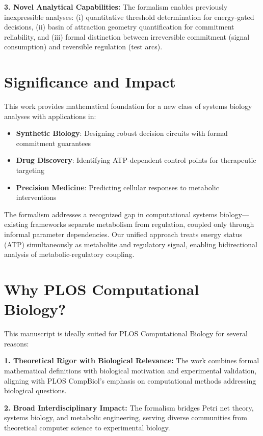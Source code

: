 \documentclass[11pt,letterpaper]{article}
\begin{document}
\textbf{3. Novel Analytical Capabilities:} The formalism enables previously inexpressible analyses: (i) quantitative threshold determination for energy-gated decisions, (ii) basin of attraction geometry quantification for commitment reliability, and (iii) formal distinction between irreversible commitment (signal consumption) and reversible regulation (test arcs).

\section*{Significance and Impact}

This work provides mathematical foundation for a new class of systems biology analyses with applications in:

\begin{itemize}
\item \textbf{Synthetic Biology}: Designing robust decision circuits with formal commitment guarantees
\item \textbf{Drug Discovery}: Identifying ATP-dependent control points for therapeutic targeting
\item \textbf{Precision Medicine}: Predicting cellular responses to metabolic interventions
\end{itemize}

The formalism addresses a recognized gap in computational systems biology---existing frameworks separate metabolism from regulation, coupled only through informal parameter dependencies. Our unified approach treats energy status (ATP) simultaneously as metabolite and regulatory signal, enabling bidirectional analysis of metabolic-regulatory coupling.

\section*{Why PLOS Computational Biology?}

This manuscript is ideally suited for PLOS Computational Biology for several reasons:

\textbf{1. Theoretical Rigor with Biological Relevance:} The work combines formal mathematical definitions with biological motivation and experimental validation, aligning with PLOS CompBiol's emphasis on computational methods addressing biological questions.

\textbf{2. Broad Interdisciplinary Impact:} The formalism bridges Petri net theory, systems biology, and metabolic engineering, serving diverse communities from theoretical computer science to experimental biology.
\end{document}
